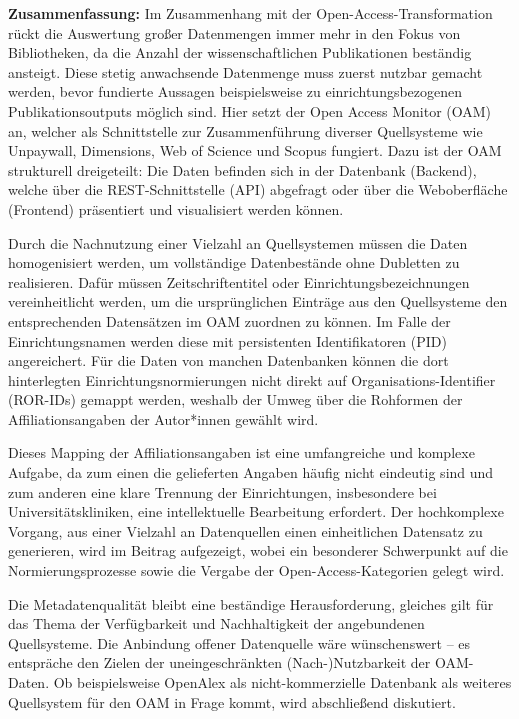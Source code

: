\textbf{Zusammenfassung:} Im Zusammenhang mit der
Open-Access-Transformation rückt die Auswertung großer Datenmengen immer
mehr in den Fokus von Bibliotheken, da die Anzahl der wissenschaftlichen
Publikationen beständig ansteigt. Diese stetig anwachsende Datenmenge
muss zuerst nutzbar gemacht werden, bevor fundierte Aussagen
beispielsweise zu einrichtungsbezogenen Publikationsoutputs möglich
sind. Hier setzt der Open Access Monitor (OAM) an, welcher als
Schnittstelle zur Zusammenführung diverser Quellsysteme wie Unpaywall,
Dimensions, Web of Science und Scopus fungiert. Dazu ist der OAM
strukturell dreigeteilt: Die Daten befinden sich in der Datenbank
(Backend), welche über die REST-Schnittstelle (API) abgefragt oder über
die Weboberfläche (Frontend) präsentiert und visualisiert werden können.

Durch die Nachnutzung einer Vielzahl an Quellsystemen müssen die Daten
homogenisiert werden, um vollständige Datenbestände ohne Dubletten zu
realisieren. Dafür müssen Zeitschriftentitel oder
Einrichtungsbezeichnungen vereinheitlicht werden, um die ursprünglichen
Einträge aus den Quellsysteme den entsprechenden Datensätzen im OAM
zuordnen zu können. Im Falle der Einrichtungsnamen werden diese mit
persistenten Identifikatoren (PID) angereichert. Für die Daten von
manchen Datenbanken können die dort hinterlegten
Einrichtungsnormierungen nicht direkt auf Organisations-Identifier
(ROR-IDs) gemappt werden, weshalb der Umweg über die Rohformen der
Affiliationsangaben der Autor*innen gewählt wird.

Dieses Mapping der Affiliationsangaben ist eine umfangreiche und
komplexe Aufgabe, da zum einen die gelieferten Angaben häufig nicht
eindeutig sind und zum anderen eine klare Trennung der Einrichtungen,
insbesondere bei Universitätskliniken, eine intellektuelle Bearbeitung
erfordert. Der hochkomplexe Vorgang, aus einer Vielzahl an Datenquellen
einen einheitlichen Datensatz zu generieren, wird im Beitrag aufgezeigt,
wobei ein besonderer Schwerpunkt auf die Normierungsprozesse sowie die
Vergabe der Open-Access-Kategorien gelegt wird.

Die Metadatenqualität bleibt eine beständige Herausforderung, gleiches
gilt für das Thema der Verfügbarkeit und Nachhaltigkeit der angebundenen
Quellsysteme. Die Anbindung offener Datenquelle wäre wünschenswert -- es
entspräche den Zielen der uneingeschränkten (Nach-)Nutzbarkeit der
OAM-Daten. Ob beispielsweise OpenAlex als nicht-kommerzielle Datenbank
als weiteres Quellsystem für den OAM in Frage kommt, wird abschließend
diskutiert.

